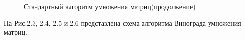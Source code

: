 \documentclass[a4paper,12pt]{report}
\begin{document}
\begin{figure}[ht!]
\caption{Стандартный алгоритм умножения матриц(продолжение)}
\end{figure}
\newpage
На Рис.2.3, 2.4, 2.5 и 2.6 представлена схема алгоритма Винограда умножения матриц.
\end{document}
